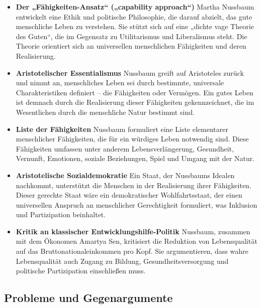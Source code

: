 \documentclass{article}
\begin{document}
\begin{itemize}
	\item \textbf{Der „Fähigkeiten-Ansatz“ („capability approach“)}
	      Martha Nussbaum entwickelt eine Ethik und politische Philosophie, die darauf abzielt, das gute menschliche Leben zu verstehen. Sie stützt sich auf eine „dichte vage Theorie des Guten“, die im Gegensatz zu Utilitarismus und Liberalismus steht. Die Theorie orientiert sich an universellen menschlichen Fähigkeiten und deren Realisierung.

	\item \textbf{Aristotelischer Essentialismus}
	      Nussbaum greift auf Aristoteles zurück und nimmt an, menschliches Leben sei durch bestimmte, universale Charakteristiken definiert – die Fähigkeiten oder Vermögen. Ein gutes Leben ist demnach durch die Realisierung dieser Fähigkeiten gekennzeichnet, die im Wesentlichen durch die menschliche Natur bestimmt sind.

	\item \textbf{Liste der Fähigkeiten}
	      Nussbaum formuliert eine Liste elementarer menschlicher Fähigkeiten, die für ein würdiges Leben notwendig sind. Diese Fähigkeiten umfassen unter anderem Lebensverlängerung, Gesundheit, Vernunft, Emotionen, soziale Beziehungen, Spiel und Umgang mit der Natur.

	\item \textbf{Aristotelische Sozialdemokratie}
	      Ein Staat, der Nussbaums Idealen nachkommt, unterstützt die Menschen in der Realisierung ihrer Fähigkeiten. Dieser gerechte Staat wäre ein demokratischer Wohlfahrtsstaat, der einen universellen Anspruch an menschlicher Gerechtigkeit formuliert, was Inklusion und Partizipation beinhaltet.

	\item \textbf{Kritik an klassischer Entwicklungshilfe-Politik}
	      Nussbaum, zusammen mit dem Ökonomen Amartya Sen, kritisiert die Reduktion von Lebensqualität auf das Bruttonationaleinkommen pro Kopf. Sie argumentieren, dass wahre Lebensqualität auch Zugang zu Bildung, Gesundheitsversorgung und politische Partizipation einschließen muss.
\end{itemize}

\subsection*{Probleme und Gegenargumente}
\end{document}
